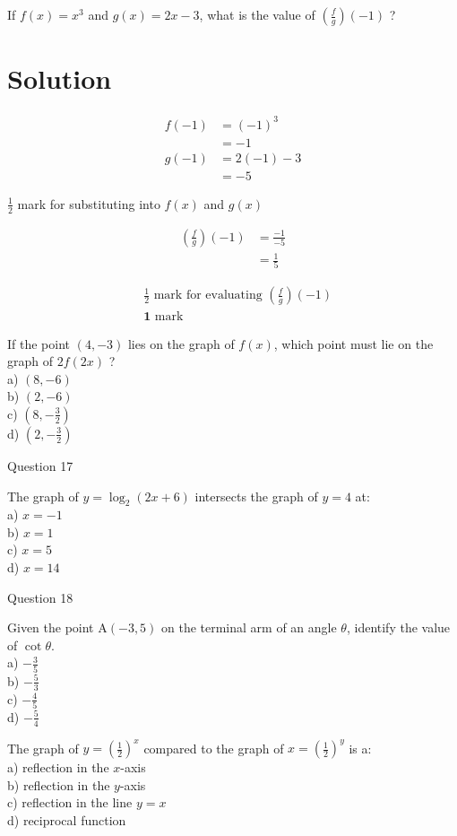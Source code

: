 \documentclass[10pt]{article}
\begin{document}
If $f(x)=x^{3}$ and $g(x)=2 x-3$, what is the value of $\left(\frac{f}{g}\right)(-1)$ ?

\section*{Solution}
$$
\begin{aligned}
f(-1) & =(-1)^{3} \\
& =-1 \\
g(-1) & =2(-1)-3 \\
& =-5
\end{aligned}
$$

$\frac{1}{2}$ mark for substituting into $f(x)$ and $g(x)$

$$
\begin{aligned}
\left(\frac{f}{g}\right)(-1) & =\frac{-1}{-5} \\
& =\frac{1}{5}
\end{aligned}
$$

$$
\begin{aligned}
& \frac{1}{2} \text { mark for evaluating }\left(\frac{f}{g}\right)(-1) \\
& \mathbf{1} \text { mark }
\end{aligned}
$$

If the point $(4,-3)$ lies on the graph of $f(x)$, which point must lie on the graph of $2 f(2 x)$ ?\\
a) $(8,-6)$\\
b) $(2,-6)$\\
c) $\left(8,-\frac{3}{2}\right)$\\
d) $\left(2,-\frac{3}{2}\right)$

Question 17

The graph of $y=\log _{2}(2 x+6)$ intersects the graph of $y=4$ at:\\
a) $x=-1$\\
b) $x=1$\\
c) $x=5$\\
d) $x=14$

Question 18

Given the point $\mathrm{A}(-3,5)$ on the terminal arm of an angle $\theta$, identify the value of $\cot \theta$.\\
a) $-\frac{3}{5}$\\
b) $-\frac{5}{3}$\\
c) $-\frac{4}{5}$\\
d) $-\frac{5}{4}$

The graph of $y=\left(\frac{1}{2}\right)^{x}$ compared to the graph of $x=\left(\frac{1}{2}\right)^{y}$ is a:\\
a) reflection in the $x$-axis\\
b) reflection in the $y$-axis\\
c) reflection in the line $y=x$\\
d) reciprocal function
\end{document}
